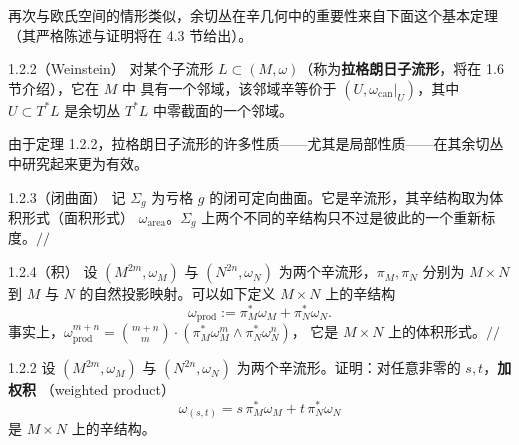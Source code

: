 再次与欧氏空间的情形类似，余切丛在辛几何中的重要性来自下面这个基本定理（其严格陈述与证明将在
4.3 节给出）。

\begin{wthm}{1.2.2}（Weinstein）
对某个子流形 $L\subset(M,\omega)$（称为\textbf{拉格朗日子流形}，将在 1.6 节介绍），它在 $M$ 中
具有一个邻域，该邻域辛等价于 $(U,\omega_{\mathrm{can}}|_U)$，其中 $U\subset T^*L$ 是余切丛
$T^*L$ 中零截面的一个邻域。
\end{wthm}

由于定理 1.2.2，拉格朗日子流形的许多性质——尤其是局部性质——在其余切丛中研究起来更为有效。

\begin{wexam}{1.2.3}（闭曲面）
记 $\Sigma_g$ 为亏格 $g$ 的闭可定向曲面。它是辛流形，其辛结构取为体积形式（面积形式）
$\omega_{\mathrm{area}}$。$\Sigma_g$ 上两个不同的辛结构只不过是彼此的一个重新标度。\hfill$//$
\end{wexam}

\begin{wexam}{1.2.4}（积）
设 $(M^{2m},\omega_M)$ 与 $(N^{2n},\omega_N)$ 为两个辛流形，$\pi_M,\pi_N$ 分别为 $M\times N$ 到 $M$
与 $N$ 的自然投影映射。可以如下定义 $M\times N$ 上的辛结构
\begin{equation}
  \omega_{\mathrm{prod}}:=\pi_M^*\omega_M+\pi_N^*\omega_N .
  \tag{1.4}
\end{equation}
事实上，$\omega_{\mathrm{prod}}^{m+n}=\binom{m+n}{m}\cdot\left(\pi_M^*\omega_M^m\wedge\pi_N^*\omega_N^n\right)$，
它是 $M\times N$ 上的体积形式。\hfill$//$
\end{wexam}

\begin{wexer}{1.2.2}
设 $(M^{2m},\omega_M)$ 与 $(N^{2n},\omega_N)$ 为两个辛流形。证明：对任意非零的 $s,t$，\textbf{加权积}
（weighted product）
\[
  \omega_{(s,t)}=s\,\pi_M^*\omega_M+t\,\pi_N^*\omega_N
\]
是 $M\times N$ 上的辛结构。
\end{wexer}

